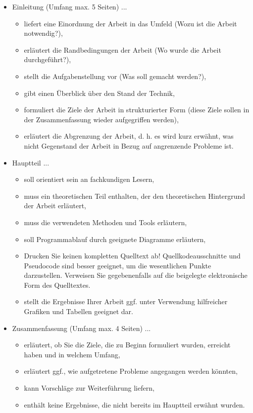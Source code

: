 \begin{itemize}
\item Einleitung (Umfang max. 5 Seiten) ...
\begin{itemize}
\item liefert eine Einordnung der Arbeit in das Umfeld (Wozu ist die Arbeit notwendig?),
\item erläutert die Randbedingungen der Arbeit (Wo wurde die Arbeit durchgeführt?),
\item stellt die Aufgabenstellung vor (Was soll gemacht werden?),
\item gibt einen Überblick über den Stand der Technik,
\item formuliert die Ziele der Arbeit in strukturierter Form (diese Ziele sollen in der Zusammenfassung wieder aufgegriffen werden),
\item erläutert die Abgrenzung der Arbeit, d. h. es wird kurz erwähnt, was nicht Gegenstand der Arbeit in Bezug auf angrenzende Probleme ist.
\end{itemize}

\item Hauptteil ...  
\begin{itemize}
\item soll orientiert sein an fachkundigen Lesern,
\item muss ein theoretischen Teil enthalten, der den theoretischen Hintergrund der Arbeit erläutert,
\item muss die verwendeten Methoden und Tools erläutern,
\item soll Programmablauf durch geeignete Diagramme erläutern,
\item Drucken Sie keinen kompletten Quelltext ab! Quellkodeausschnitte und Pseudocode sind besser geeignet, um die wesentlichen Punkte darzustellen. Verweisen Sie gegebenenfalls auf die beigelegte elektronische Form des Quelltextes.
\item stellt die Ergebnisse Ihrer Arbeit ggf. unter Verwendung hilfreicher Grafiken und 
Tabellen geeignet dar. 
\end{itemize}

\item Zusammenfassung (Umfang max. 4 Seiten) ...
\begin{itemize}
\item erläutert, ob Sie die Ziele, die zu Beginn formuliert wurden, erreicht haben und in welchem Umfang,
\item erläutert ggf., wie aufgetretene Probleme angegangen werden könnten,
\item kann Vorschläge zur Weiterführung liefern, 
\item enthält keine Ergebnisse, die nicht bereits im Hauptteil erwähnt wurden.
\end{itemize}

\end{itemize}

